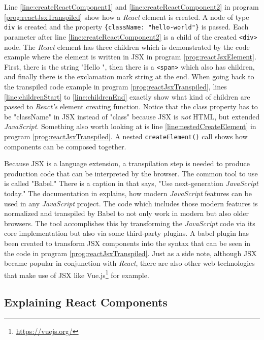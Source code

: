 Line \ref{line:createReactComponent1} and \ref{line:createReactComponent2} in program \ref{prog:reactJsxTranspiled} show how a \emph{React} element is created. A node of type \texttt{div} is created and the property \texttt{\{className: "hello-world"\}} is passed. Each parameter after line \ref{line:createReactComponent2} is a child of the created \texttt{<div>} node. The \emph{React} element has three children which is demonstrated by the code example where the element is written in JSX in program \ref{prog:reactJsxElement}. First, there is the string "Hello ", then there is a \texttt{<span>} which also has children, and finally there is the exclamation mark string at the end. When going back to the transpiled code example in program \ref{prog:reactJsxTranspiled}, lines \ref{line:childrenStart} to \ref{line:childrenEnd} exactly show what kind of children are passed to \emph{React's} element creating function. Notice that the class property has to be "className" in JSX instead of "class" because JSX is \emph{not} HTML, but extended \emph{JavaScript}. Something also worth looking at is line \ref{line:nestedCreateElement} in program \ref{prog:reactJsxTranspiled}. A nested \texttt{createElement()} call shows how components can be composed together.

Because JSX is a language extension, a transpilation step is needed to produce production code that can be interpreted by the browser. The common tool to use is called "Babel." There is a caption in \cite{Babel} that says, "Use next-generation \emph{JavaScript} today." The documentation in \cite{Babel} explains, how modern \emph{JavaScript} features can be used in any \emph{JavaScript} project. The code which includes those modern features is normalized and transpiled by Babel to not only work in modern but also older browsers. The tool accomplishes this by transforming the \emph{JavaScript} code via its core implementation but also via some third-party plugins. A babel plugin has been created to transform JSX components into the syntax that can be seen in the code in program \ref{prog:reactJsxTranspiled}. Just as a side note, although JSX became popular in conjunction with \emph{React}, there are also other web technologies that make use of JSX like Vue.js\footnote{\url{https://vuejs.org/}} for example.

\subsection{Explaining React Components}
\label{sec:reactComponents}

